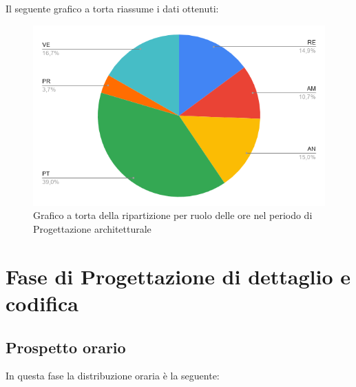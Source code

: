 {{{{{{Il seguente grafico a torta riassume i dati ottenuti:
\begin{figure}[!ht]
	\begin{center}
		\includegraphics[width=0.8\linewidth]{../immagini/pdp/torta_progettazione_architetturale.png}
		\caption{Grafico a torta della ripartizione per ruolo delle ore nel periodo di Progettazione
			architetturale}
	\end{center}
\end{figure}

\section{Fase di Progettazione di dettaglio e codifica}\label{PreventivoFaseDiProgettazioneDiDettaglioECodifica}

\subsection{Prospetto orario}\label{PreventivoFaseDiProgettazioneDiDettaglioECodificaProspettoOrario}
In questa fase la distribuzione oraria è la seguente:
\quad
\def\tabularxcolumn#1{m{#1}}
{

}}}}}}}
